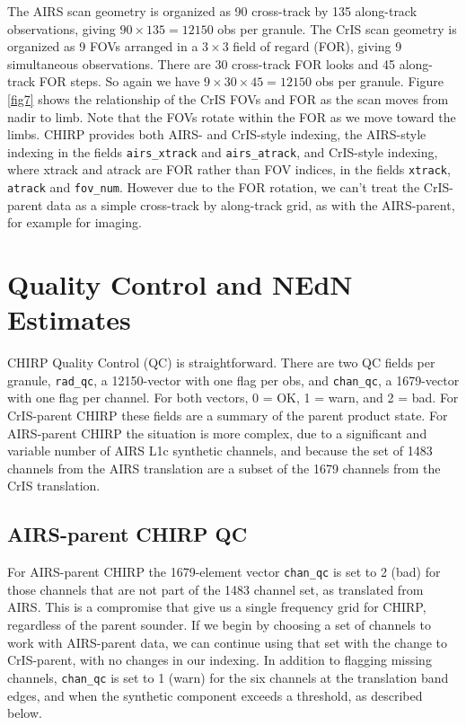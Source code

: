\documentclass[11pt]{article}
\begin{document}
The AIRS scan geometry is organized as 90 cross-track by 135
along-track observations, giving $90 \times 135 = 12150$ obs per
granule.  The CrIS scan geometry is organized as 9 FOVs arranged
in a $3 \times 3$ field of regard (FOR), giving 9 simultaneous
observations.  There are 30 cross-track FOR looks and 45 along-track
FOR steps.  So again we have $9 \times 30 \times 45 = 12150$ obs per
granule.  Figure \ref{fig7} shows the relationship of the CrIS FOVs
and FOR as the scan moves from nadir to limb.  Note that the FOVs
rotate within the FOR as we move toward the limbs.  CHIRP provides
both AIRS- and CrIS-style indexing, the AIRS-style indexing in the
fields \texttt{airs\_xtrack} and \texttt{airs\_atrack}, and
CrIS-style indexing, where xtrack and atrack are FOR rather than FOV
indices, in the fields \texttt{xtrack}, \texttt{atrack} and
\texttt{fov\_num}.  However due to the FOR rotation, we can't treat
the CrIS-parent data as a simple cross-track by along-track grid, as
with the AIRS-parent, for example for imaging.


\section{Quality Control and NEdN Estimates}
\label{qcnedn}

CHIRP Quality Control (QC) is straightforward.  There are two QC
fields per granule, \texttt{rad\_qc}, a 12150-vector with one flag
per obs, and \texttt{chan\_qc}, a 1679-vector with one flag per
channel.  For both vectors, 0 = OK, 1 = warn, and 2 = bad.  For
CrIS-parent CHIRP these fields are a summary of the parent product
state.  For AIRS-parent CHIRP the situation is more complex, due to
a significant and variable number of AIRS L1c synthetic channels,
and because the set of 1483 channels from the AIRS translation are a
subset of the 1679 channels from the CrIS translation.

\subsection{AIRS-parent CHIRP QC}

For AIRS-parent CHIRP the 1679-element vector \texttt{chan\_qc} is
set to 2 (bad) for those channels that are not part of the 1483
channel set, as translated from AIRS.  This is a compromise that
give us a single frequency grid for CHIRP, regardless of the parent
sounder.  If we begin by choosing a set of channels to work with
AIRS-parent data, we can continue using that set with the change to
CrIS-parent, with no changes in our indexing.  In addition to
flagging missing channels, \texttt{chan\_qc} is set to 1 (warn) for
the six channels at the translation band edges, and when the
synthetic component exceeds a threshold, as described below.
\end{document}
